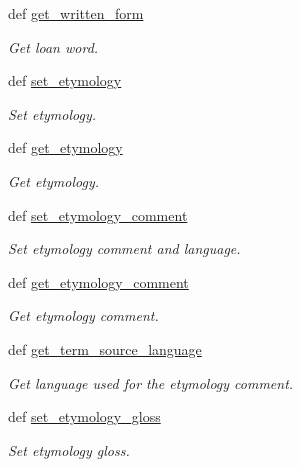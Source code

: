 \begin{DoxyCompactItemize}
def \hyperlink{classlmf_1_1src_1_1core_1_1lexical__entry_1_1_lexical_entry_a68a87b24b174bccf92e6a400b6208de4}{get\+\_\+written\+\_\+form}
\begin{DoxyCompactList}\small\item\em Get loan word. \end{DoxyCompactList}\item 
def \hyperlink{classlmf_1_1src_1_1core_1_1lexical__entry_1_1_lexical_entry_a90650c9ec70a484186405f9b40efa618}{set\+\_\+etymology}
\begin{DoxyCompactList}\small\item\em Set etymology. \end{DoxyCompactList}\item 
def \hyperlink{classlmf_1_1src_1_1core_1_1lexical__entry_1_1_lexical_entry_ab2168094e851c2dccb798fc2a0e45ec2}{get\+\_\+etymology}
\begin{DoxyCompactList}\small\item\em Get etymology. \end{DoxyCompactList}\item 
def \hyperlink{classlmf_1_1src_1_1core_1_1lexical__entry_1_1_lexical_entry_ac585a9ac515b028d919fd4902bcf5c1b}{set\+\_\+etymology\+\_\+comment}
\begin{DoxyCompactList}\small\item\em Set etymology comment and language. \end{DoxyCompactList}\item 
def \hyperlink{classlmf_1_1src_1_1core_1_1lexical__entry_1_1_lexical_entry_a667de841ccf2e947f15ed1b3fbd3fe77}{get\+\_\+etymology\+\_\+comment}
\begin{DoxyCompactList}\small\item\em Get etymology comment. \end{DoxyCompactList}\item 
def \hyperlink{classlmf_1_1src_1_1core_1_1lexical__entry_1_1_lexical_entry_a5588b93f3b5fc77c3ea74fd7fef1cca1}{get\+\_\+term\+\_\+source\+\_\+language}
\begin{DoxyCompactList}\small\item\em Get language used for the etymology comment. \end{DoxyCompactList}\item 
def \hyperlink{classlmf_1_1src_1_1core_1_1lexical__entry_1_1_lexical_entry_a9e37ea6e11cfdd10b7fe48f332d5dbe9}{set\+\_\+etymology\+\_\+gloss}
\begin{DoxyCompactList}\small\item\em Set etymology gloss. \end{DoxyCompactList}\item 

\end{DoxyCompactItemize}
